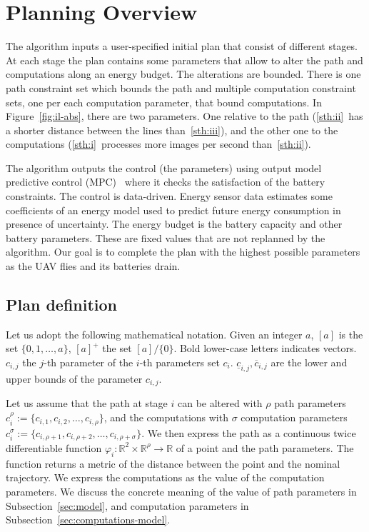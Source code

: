 \documentclass[letterpaper,10pt,conference]{ieeeconf}
\theoremstyle{definition}
\begin{document}
\section{Planning Overview}  %
\label{sec:prob}             %
The algorithm inputs a user-specified initial plan that consist of different stages. At each stage the plan contains some parameters that allow to alter the path and computations along an energy budget. The alterations are bounded. There is one path constraint set which bounds the path and multiple computation constraint sets, one per each computation parameter, that bound computations. In Figure~\ref{fig:il-abs}, there are two parameters. One relative to the path (\ref{sth:ii}~has a shorter distance between the lines than~\ref{sth:iii}), and the other one to the computations (\ref{sth:i}~processes more images per second than~\ref{sth:ii}). 

The algorithm outputs the control (the parameters) using output model predictive control (MPC)~\cite{rawlings2017model} where it checks the satisfaction of the battery constraints. The control is data-driven. Energy sensor data estimates some coefficients of an energy model used to predict future energy consumption in presence of uncertainty. The energy budget is the battery capacity and other battery parameters. These are fixed values that are not replanned by the algorithm. Our goal is to complete the plan with the highest possible parameters as the UAV flies and its batteries drain. 

\subsection{Plan definition}
\label{sec:prelim}

Let us adopt the following mathematical notation. Given an integer $a$, $[a]$ is the set $\{0,1,\dots,a\}$, $[a]^+$ the set $[a]/\{0\}$. Bold lower-case letters indicates vectors. $c_{i,j}$ the $j$-th parameter of the $i$-th parameters set $c_i$. $\underline{c}_{i,j},\overline{c}_{i,j}$ are the lower and upper bounds of the parameter $c_{i,j}$.

Let us assume that the path at stage $i$ can be altered with $\rho$ path parameters $c_i^\rho:=\{c_{i,1},c_{i,2},\dots,c_{i,\rho}\}$, and the computations with $\sigma$ computation parameters $c_i^\sigma:=\{c_{i,\rho+1},c_{i,\rho+2},\dots,c_{i,\rho+\sigma}\}$. We then express the path as a continuous twice differentiable function $\varphi_i:\mathbb{R}^2\times\mathbb{R}^\rho\rightarrow\mathbb{R}$ of a point and the path parameters. The function returns a metric of the distance between the point and the nominal trajectory. We express the computations as the value of the computation parameters. We discuss the concrete meaning of the value of path parameters in Subsection~\ref{sec:model}, and computation parameters in Subsection~\ref{sec:computations-model}.
\end{document}
